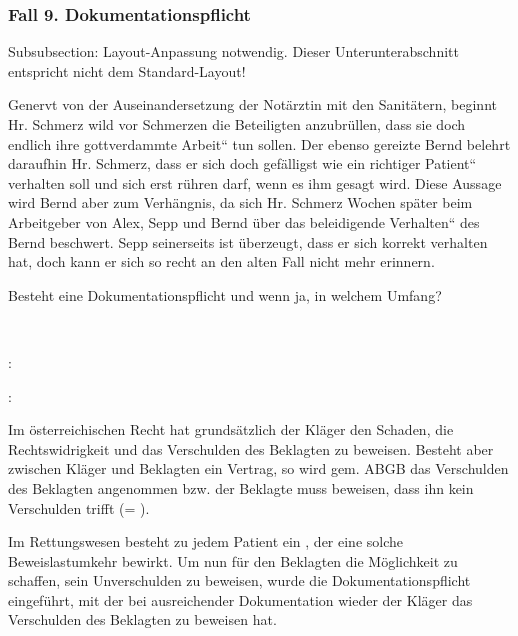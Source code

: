 \subsubsection{Fall 9. Dokumentationspflicht}
\begin{anfxwarning}[author=GABS]{Subsubsection: Layout-Anpassung notwendig.}
Dieser Unterunterabschnitt entspricht nicht dem Standard-Layout!
\end{anfxwarning}
\label{topic:dokumentation-rechtlich}


Genervt von der Auseinandersetzung der Notärztin mit den Sanitätern,
beginnt Hr. Schmerz wild vor Schmerzen die Beteiligten anzubr\"ullen,
dass sie doch endlich ihre {\quotedblbase}gottverdammte
Arbeit{\textquotedblleft} tun sollen. Der ebenso gereizte Bernd belehrt
daraufhin Hr. Schmerz, dass er sich doch gefälligst wie ein
{\quotedblbase}richtiger Patient{\textquotedblleft} verhalten soll und
sich erst r\"uhren darf, wenn es ihm gesagt wird. Diese Aussage wird
Bernd aber zum Verhängnis, da sich Hr. Schmerz Wochen später beim
Arbeitgeber von Alex, Sepp und Bernd \"uber das
{\quotedblbase}beleidigende Verhalten{\textquotedblleft} des Bernd
beschwert. Sepp seinerseits ist \"uberzeugt, dass er sich korrekt
verhalten hat, doch kann er sich so recht an den alten Fall nicht mehr
erinnern.


Besteht eine Dokumentationspflicht und wenn ja, in welchem Umfang?

~

 :
{\quotedblbase}

:

Im \"osterreichischen Recht hat grundsätzlich der Kläger den
Schaden, die Rechtswidrigkeit und das Verschulden des Beklagten zu
beweisen. Besteht aber zwischen Kläger und Beklagten ein Vertrag, so
wird gem.  ABGB das Verschulden des Beklagten
angenommen bzw. der Beklagte muss beweisen, dass ihn kein Verschulden trifft (=
).

Im Rettungswesen besteht zu jedem Patient ein , der eine
solche Beweislastumkehr bewirkt. Um nun f\"ur den Beklagten die
M\"oglichkeit zu schaffen, sein Unverschulden zu beweisen, wurde die
Dokumentationspflicht eingef\"uhrt, mit der bei ausreichender
Dokumentation wieder der Kläger das Verschulden des Beklagten zu
beweisen hat.

